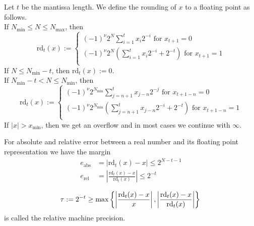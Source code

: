 \begin{definition} \label{theo:round}
    Let \(t\) be the mantissa length. We define the rounding of \(x\) to a floating point as follows. \\
    If \(N_{\text{min}} \leq N \leq N_{\text{max}}\), then
    \begin{equation*}
        \text{rd}_t(x) :=
        \begin{cases}
            (-1)^{\nu} 2^N \sum_{i = 1}^{t}x_i 2^{-i} \text{ for } x_{t+1} = 0 \\
            (-1)^{\nu} 2^N (\sum_{i = 1}^{t}x_i 2^{-i} + 2^{-t}) \text{ for } x_{t+1} = 1 \\
        \end{cases}
    \end{equation*}
    If \(N \leq N_{\text{min}} - t\), then \(\text{rd}_t(x) := 0\). \\
    If \(N_{\text{min}} - t < N \leq N_{\text{min}}\), then
    \begin{equation*}
        \text{rd}_t(x) :=
        \begin{cases}
            (-1)^{\nu} 2^{N_{\text{min}}} \sum_{j = n + 1}^{t}x_{j-n} 2^{-j} \text{ for } x_{t+1-n} = 0 \\
            (-1)^{\nu} 2^{N_{\text{min}}} (\sum_{j = n + 1}^{t}x_{j-n} 2^{-i} + 2^{-t}) \text{ for } x_{t+1-n} = 1 \\
        \end{cases}
    \end{equation*}
    If \(|x| > x_{\text{min}}\), then we get an overflow and in most cases we continue with \(\infty\).  \cite{bib:rabus}
\end{definition}
%
\begin{lemma} \label{theo:margin}
    For absolute and relative error between a real number and its floating point representation we have the margin  \cite{bib:rabus}
    \begin{align*}
        e_{\text{abs}} &= | \text{rd}_t(x) - x | \leq 2^{N - t - 1} \\
        e_{\text{rel}} &= \left| \frac{\text{rd}_t(x) - x}{\text{rd}_t(x)} \right| \leq 2^{-t}
    \end{align*}
\end{lemma}
%
\begin{definition}
    \begin{equation*}
        \tau := 2^{-t} \geq \text{max} \left\{ \left| \frac{\text{rd}_t(x) - x}{x}\right|, \left| \frac{\text{rd}_t(x) - x}{\text{rd}_t(x)} \right| \right\} \\
    \end{equation*}
    is called the relative machine precision.  \cite{bib:rabus}
\end{definition}

